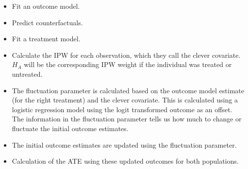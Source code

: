 \begin{itemize}
    \item Fit an outcome model.
    \item Predict counterfactuals.
    \item Fit a treatment model.
    \item Calculate the IPW for each observation, which they call the clever covariate. 
    $H_A$ will be the corresponding IPW weight if the individual was treated or untreated.
    \item The fluctuation parameter is calculated based on the outcome model estimate (for the right treatment) and the clever covariate. 
    This is calculated using a logistic regression model using the logit transformed outcome as an offset.
    The information in the fluctuation parameter tells us how much to change or fluctuate the initial outcome estimates.
    \item The initial outcome estimates are updated using the fluctuation parameter.
    \item Calculation of the ATE using these updated outcomes for both populations.
\end{itemize}

